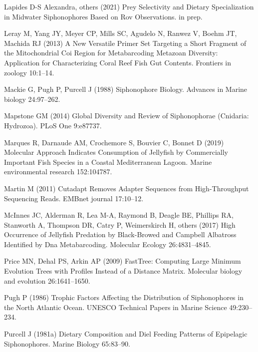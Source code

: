 \documentclass[12pt,]{article}
\begin{document}
\leavevmode\hypertarget{ref-lapides2021prey}{}%
Lapides D-S Alexandra, others (2021) Prey Selectivity and Dietary Specialization in Midwater Siphonophores Based on Rov Observations. in prep.

\leavevmode\hypertarget{ref-leray2013new}{}%
Leray M, Yang JY, Meyer CP, Mills SC, Agudelo N, Ranwez V, Boehm JT, Machida RJ (2013) A New Versatile Primer Set Targeting a Short Fragment of the Mitochondrial Coi Region for Metabarcoding Metazoan Diversity: Application for Characterizing Coral Reef Fish Gut Contents. Frontiers in zoology 10:1--14.

\leavevmode\hypertarget{ref-mackie1988siphonophore}{}%
Mackie G, Pugh P, Purcell J (1988) Siphonophore Biology. Advances in Marine biology 24:97--262.

\leavevmode\hypertarget{ref-mapstone2014global}{}%
Mapstone GM (2014) Global Diversity and Review of Siphonophorae (Cnidaria: Hydrozoa). PLoS One 9:e87737.

\leavevmode\hypertarget{ref-marques2019molecular}{}%
Marques R, Darnaude AM, Crochemore S, Bouvier C, Bonnet D (2019) Molecular Approach Indicates Consumption of Jellyfish by Commercially Important Fish Species in a Coastal Mediterranean Lagoon. Marine environmental research 152:104787.

\leavevmode\hypertarget{ref-martin2011cutadapt}{}%
Martin M (2011) Cutadapt Removes Adapter Sequences from High-Throughput Sequencing Reads. EMBnet journal 17:10--12.

\leavevmode\hypertarget{ref-mcinnes2017high}{}%
McInnes JC, Alderman R, Lea M-A, Raymond B, Deagle BE, Phillips RA, Stanworth A, Thompson DR, Catry P, Weimerskirch H, others (2017) High Occurrence of Jellyfish Predation by Black-Browed and Campbell Albatross Identified by Dna Metabarcoding. Molecular Ecology 26:4831--4845.

\leavevmode\hypertarget{ref-price2009fasttree}{}%
Price MN, Dehal PS, Arkin AP (2009) FastTree: Computing Large Minimum Evolution Trees with Profiles Instead of a Distance Matrix. Molecular biology and evolution 26:1641--1650.

\leavevmode\hypertarget{ref-pugh1986trophic}{}%
Pugh P (1986) Trophic Factors Affecting the Distribution of Siphonophores in the North Atlantic Ocean. UNESCO Technical Papers in Marine Science 49:230--234.

\leavevmode\hypertarget{ref-purcell1981dietary}{}%
Purcell J (1981a) Dietary Composition and Diel Feeding Patterns of Epipelagic Siphonophores. Marine Biology 65:83--90.
\end{document}

